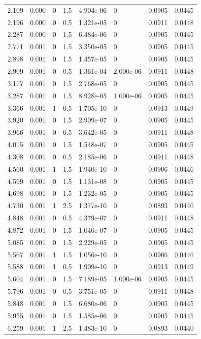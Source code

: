 \documentclass[preview]{standalone}
\begin{document}
{{\begin{tabular}{L{1.2cm}C{1.2cm} C{0.3cm}C{0.5cm} C{1.4cm}C{1.4cm} C{1.4cm}C{1.4cm}}
  2.109  &  0.000  & 0     & 1.5 &  4.904e-06  & 0  & 0.0905 &  0.0445   \\ 
  2.196  &  0.000  & 0     & 0.5 &  1.321e-05  & 0  & 0.0911 &  0.0448   \\ 
  2.287  &  0.000  & 0     & 1.5 &  6.484e-06  & 0  & 0.0905 &  0.0445   \\ 
  2.771  &  0.001  & 0     & 1.5 &  3.350e-05  & 0  & 0.0905 &  0.0445   \\ 
  2.898  &  0.001  & 0     & 1.5 &  1.457e-05  & 0  & 0.0905 &  0.0445   \\ 
  2.909  &  0.001  & 0     & 0.5 &  1.361e-04  & 2.000e-06  & 0.0911 &  0.0448   \\ 
  3.177  &  0.001  & 0     & 1.5 &  2.768e-05  & 0  & 0.0905 &  0.0445   \\ 
  3.287  &  0.001  & 0     & 1.5 &  8.928e-05  & 1.000e-06  & 0.0905 &  0.0445   \\ 
  3.366  &  0.001  & 1     & 0.5 &  1.705e-10  & 0  & 0.0913 &  0.0449   \\ 
  3.920  &  0.001  & 0     & 1.5 &  2.909e-07  & 0  & 0.0905 &  0.0445   \\ 
  3.966  &  0.001  & 0     & 0.5 &  3.642e-05  & 0  & 0.0911 &  0.0448   \\ 
  4.015  &  0.001  & 0     & 1.5 &  1.548e-07  & 0  & 0.0905 &  0.0445   \\ 
  4.308  &  0.001  & 0     & 0.5 &  2.185e-06  & 0  & 0.0911 &  0.0448   \\ 
  4.560  &  0.001  & 1     & 1.5 &  1.940e-10  & 0  & 0.0906 &  0.0446   \\ 
  4.599  &  0.001  & 0     & 1.5 &  1.131e-08  & 0  & 0.0905 &  0.0445   \\ 
  4.698  &  0.001  & 0     & 1.5 &  1.232e-05  & 0  & 0.0905 &  0.0445   \\ 
  4.730  &  0.001  & 1     & 2.5 &  1.377e-10  & 0  & 0.0893 &  0.0440   \\ 
  4.848  &  0.001  & 0     & 0.5 &  4.379e-07  & 0  & 0.0911 &  0.0448   \\ 
  4.872  &  0.001  & 0     & 1.5 &  1.046e-07  & 0  & 0.0905 &  0.0445   \\ 
  5.085  &  0.001  & 0     & 1.5 &  2.229e-05  & 0  & 0.0905 &  0.0445   \\ 
  5.567  &  0.001  & 1     & 1.5 &  1.056e-10  & 0  & 0.0906 &  0.0446   \\ 
  5.588  &  0.001  & 1     & 0.5 &  1.909e-10  & 0  & 0.0913 &  0.0449   \\ 
  5.604  &  0.001  & 0     & 1.5 &  7.189e-05  & 1.000e-06  & 0.0905 &  0.0445   \\ 
  5.796  &  0.001  & 0     & 0.5 &  3.751e-05  & 0  & 0.0911 &  0.0448   \\ 
  5.848  &  0.001  & 0     & 1.5 &  6.680e-06  & 0  & 0.0905 &  0.0445   \\ 
  5.955  &  0.001  & 0     & 1.5 &  1.585e-06  & 0  & 0.0905 &  0.0445   \\ 
  6.259  &  0.001  & 1     & 2.5 &  1.483e-10  & 0  & 0.0893 &  0.0440   \\ 
\hline 
\end{tabular} 

}}
\end{document}
